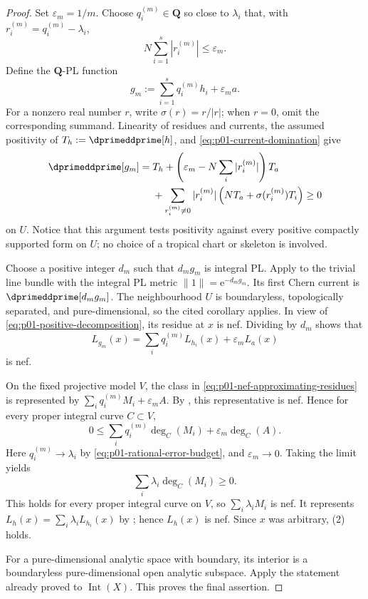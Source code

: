 \begin{proof}
Set $\varepsilon_m=1/m$.  Choose $q_i^{(m)}\in\mathbf Q$ so close to
$\lambda_i$ that, with $r_i^{(m)}=q_i^{(m)}-\lambda_i$,
\begin{equation}
\label{eq:p01-rational-error-budget}
                    N\sum_{i=1}^{s}|r_i^{(m)}|\leq\varepsilon_m.
\end{equation}
Define the $\mathbf Q$-PL function
\begin{equation}
\label{eq:p01-rational-positive-approximants}
                       g_m:=\sum_{i=1}^{s}q_i^{(m)}h_i
                                  +\varepsilon_m a.
\end{equation}
For a nonzero real number $r$, write $\sigma(r)=r/|r|$; when $r=0$, omit
the corresponding summand.  Linearity of residues and currents, the
assumed positivity of $T_h:=\dprimeddprime[h]$, and
\eqref{eq:p01-current-domination} give
\begin{align}
\label{eq:p01-positive-decomposition}
 \dprimeddprime[g_m]
  ={}&T_h
    +\left(\varepsilon_m-N\sum_i|r_i^{(m)}|\right)T_a \\
   &+\sum_{r_i^{(m)}\ne0}|r_i^{(m)}|
       \left(NT_a+\sigma(r_i^{(m)})T_i\right)\geq0
\end{align}
on $U$.  Notice that this argument tests positivity against every positive
compactly supported form on $U$; no choice of a tropical chart or skeleton
is involved.

Choose a positive integer $d_m$ such that $d_mg_m$ is integral PL.  Apply
\cite[Corollary~18.8.8]{CLD25} to the trivial line bundle with the integral
PL metric $\lVert1\rVert=\mathrm e^{-d_mg_m}$.  Its first Chern current is
$\dprimeddprime[d_mg_m]$.  The neighbourhood $U$ is boundaryless,
topologically separated, and pure-dimensional, so the cited corollary
applies.  In view of
\eqref{eq:p01-positive-decomposition}, its residue at $x$ is nef.  Dividing
by $d_m$ shows that
\begin{equation}
\label{eq:p01-nef-approximating-residues}
             L_{g_m}(x)=\sum_iq_i^{(m)}L_{h_i}(x)
                              +\varepsilon_mL_a(x)
\end{equation}
is nef.

On the fixed projective model $V$, the class in
\eqref{eq:p01-nef-approximating-residues} is represented by
$\sum_iq_i^{(m)}M_i+\varepsilon_mA$.  By
\cite[Lemma~6.11]{GJR26}, this representative is nef.  Hence for every
proper integral curve $C\subset V$,
\[
  0\leq
  \sum_iq_i^{(m)}\deg_C(M_i)+\varepsilon_m\deg_C(A).
\]
Here $q_i^{(m)}\to\lambda_i$ by
\eqref{eq:p01-rational-error-budget}, and $\varepsilon_m\to0$.  Taking the
limit yields
\[
                       \sum_i\lambda_i\deg_C(M_i)\geq0.
\]
This holds for every proper integral curve on $V$, so
$\sum_i\lambda_iM_i$ is nef.  It represents
$L_h(x)=\sum_i\lambda_iL_{h_i}(x)$ by
\cite[Lemma~6.18]{GJR26}; hence $L_h(x)$ is nef.  Since $x$ was arbitrary,
(2) holds.

For a pure-dimensional analytic space with boundary, its interior is a
boundaryless pure-dimensional open analytic subspace.  Apply the statement
already proved to $\operatorname{Int}(X)$.  This proves the final assertion.
\end{proof}
